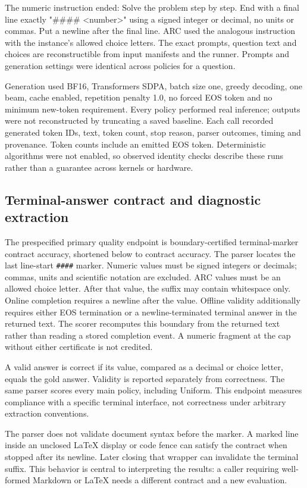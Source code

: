 \documentclass[12pt,a4paper]{article}
\begin{document}
The numeric instruction ended: Solve the problem step by step. End with a final line exactly "\#\#\#\# <number>" using a signed integer or decimal, no units or commas. Put a newline after the final line. ARC used the analogous instruction with the instance's allowed choice letters. The exact prompts, question text and choices are reconstructible from input manifests and the runner. Prompts and generation settings were identical across policies for a question.

Generation used BF16, Transformers SDPA, batch size one, greedy decoding, one beam, cache enabled, repetition penalty 1.0, no forced EOS token and no minimum new-token requirement. Every policy performed real inference; outputs were not reconstructed by truncating a saved baseline. Each call recorded generated token IDs, text, token count, stop reason, parser outcomes, timing and provenance. Token counts include an emitted EOS token. Deterministic algorithms were not enabled, so observed identity checks describe these runs rather than a guarantee across kernels or hardware.

\subsection{Terminal-answer contract and diagnostic extraction}
The prespecified primary quality endpoint is boundary-certified terminal-marker contract accuracy, shortened below to contract accuracy. The parser locates the last line-start \texttt{\#\#\#\#} marker. Numeric values must be signed integers or decimals; commas, units and scientific notation are excluded. ARC values must be an allowed choice letter. After that value, the suffix may contain whitespace only. Online completion requires a newline after the value. Offline validity additionally requires either EOS termination or a newline-terminated terminal answer in the returned text. The scorer recomputes this boundary from the returned text rather than reading a stored completion event. A numeric fragment at the cap without either certificate is not credited.

A valid answer is correct if its value, compared as a decimal or choice letter, equals the gold answer. Validity is reported separately from correctness. The same parser scores every main policy, including Uniform. This endpoint measures compliance with a specific terminal interface, not correctness under arbitrary extraction conventions.

The parser does not validate document syntax before the marker. A marked line inside an unclosed LaTeX display or code fence can satisfy the contract when stopped after its newline. Later closing that wrapper can invalidate the terminal suffix. This behavior is central to interpreting the results: a caller requiring well-formed Markdown or LaTeX needs a different contract and a new evaluation.
\end{document}
